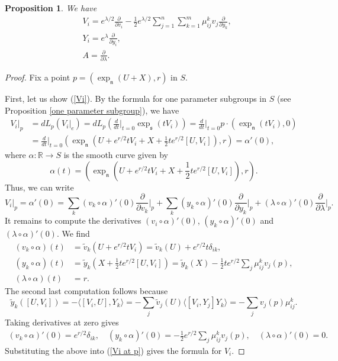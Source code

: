 \documentclass{amsart}
\newcommand{\R}{\mathbb R}
\newcommand{\s}{\mathfrak s}
\newcommand{\n}{\mathfrak n}
\theoremstyle{plain}
\newtheorem{proposition}[theorem]{Proposition}
\theoremstyle{definition}
\theoremstyle{remark}
\begin{document}
	\begin{proposition}
		\label{frame}
		We have 
		\begin{align}
			&V_i = e^{\lambda/2} \frac{\partial}{\partial v_i} - \frac12 e^{\lambda/2} \sum_{j=1}^n \sum_{k=1}^m \mu_{ij}^k v_j \frac{\partial}{\partial y_k}, \label{Vi}\\ 
			&Y_i = e^\lambda \frac{\partial}{\partial y_i}, \label{Yi}\\
			&A = \frac{\partial}{\partial \lambda}. \label{A}
		\end{align}
	\end{proposition}
	\begin{proof}
		Fix a point $p = (\exp_\n(U+X),r)$ in $S$. 
		
		First, let us show (\ref{Vi}). By the formula for one parameter subgroups in $S$ (see Proposition \ref{one parameter subgroup}), we have
		\begin{align*}
			V_i|_p &= dL_p(V_i|_e) = dL_p \left(\frac{d}{dt}\bigg|_{t=0} \exp_\s(tV_i)\right) = \frac{d}{dt}\bigg|_{t=0} p \cdot (\exp_\n(tV_i),0) \\
			&= \frac{d}{dt}\bigg|_{t=0} \left(\exp_\n\left( U +e^{r/2} tV_i + X + \frac12 te^{r/2}[U,V_i]\right),r\right) = \alpha'(0),
		\end{align*}
		where $\alpha:\R \rightarrow S$ is the smooth curve given by 
		$$\alpha(t) = \left(\exp_\n\left( U +e^{r/2} tV_i + X + \frac12 te^{r/2}[U,V_i]\right),r\right) .$$
		Thus, we can write 
		\begin{equation}
			\label{Vi at p}
			V_i|_p = \alpha'(0) = \sum_k (v_k \circ \alpha)'(0) \frac{\partial}{\partial v_k}\bigg|_p + \sum_k (y_k \circ \alpha)'(0) \frac{\partial}{\partial y_k}\bigg|_p + (\lambda \circ \alpha)'(0) \frac{\partial}{\partial \lambda}\bigg|_p.
		\end{equation}
		It remains to compute the derivatives $(v_i \circ \alpha)'(0)$, $(y_k \circ \alpha)'(0)$ and $(\lambda \circ \alpha)'(0)$. We find 
		\begin{align*}
			(v_k \circ \alpha)(t) &= \widetilde v_k(U+e^{r/2}t V_i) = \widetilde v_k(U) + e^{r/2}t \delta_{ik}, \\
			(y_k \circ \alpha)(t) &= \widetilde y_k\left( X+ \frac12 t e^{r/2} [U,V_i]\right) = \widetilde y_k(X) - \frac12 t e^{r/2} \sum_j \mu_{ij}^k v_j(p),\\
			(\lambda \circ \alpha)(t) &= r.
		\end{align*}
		The second last computation follows because 
		$$\widetilde y_k([U,V_i]) = -\langle [V_i,U],Y_k \rangle  = - \sum_j\widetilde v_j(U) \langle[V_i, Y_j] Y_k \rangle = - \sum_j v_j(p)\mu_{ij}^k.$$
		Taking derivatives at zero gives 
		\begin{align*}
			(v_k \circ \alpha)'(0) = e^{r/2} \delta_{ik}, \quad (y_k \circ \alpha)'(0) = -\frac12 e^{r/2} \sum_j \mu_{ij}^k v_j(p), \quad (\lambda \circ \alpha)'(0) = 0.
		\end{align*}
		Substituting the above into (\ref{Vi at p}) gives the formula for $V_i$.
		

\end{proof}
\end{document}
